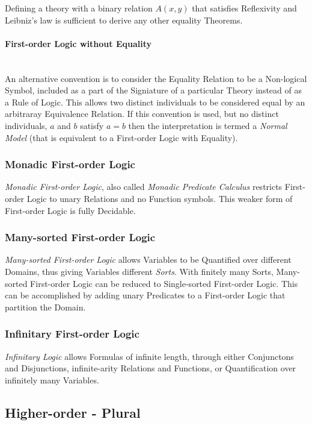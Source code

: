 \documentclass{article}
\begin{document}
Defining a theory with a binary relation $A(x,y)$ that satisfies
Reflexivity and Leibniz's law is sufficient to derive any other
equality Theorems.

\paragraph{First-order Logic without Equality} \hfill
\\ An alternative convention is to consider the Equality Relation to
be a Non-logical Symbol, included as a part of the Signiature of a
particular Theory instead of as a Rule of Logic. This allows two
distinct individuals to be considered equal by an arbitraray
Equivalence Relation. If this convention is used, but no distinct
individuals, $a$ and $b$ satisfy $a=b$ then the interpretation is
termed a \emph{Normal Model} (that is equivalent to a First-order
Logic with Equality).


\subsubsection{Monadic First-order Logic}

\emph{Monadic First-order Logic}, also called \emph{Monadic Predicate
  Calculus} restricts First-order Logic to unary Relations and no
Function symbols. This weaker form of First-order Logic is fully
Decidable.

\subsubsection{Many-sorted First-order Logic}

\emph{Many-sorted First-order Logic} allows Variables to be Quantified
over different Domains, thus giving Variables different
\emph{Sorts}. With finitely many Sorts, Many-sorted First-order Logic
can be reduced to Single-sorted First-order Logic. This can be
accomplished by adding unary Predicates to a First-order Logic that
partition the Domain.

\subsubsection{Infinitary First-order Logic}

\emph{Infinitary Logic} allows Formulas of infinite length, through
either Conjunctons and Disjunctions, infinite-arity Relations and
Functions, or Quantification over infinitely many Variables.

\subsection{Higher-order - Plural}\label{subsec:higher_order}
\end{document}
